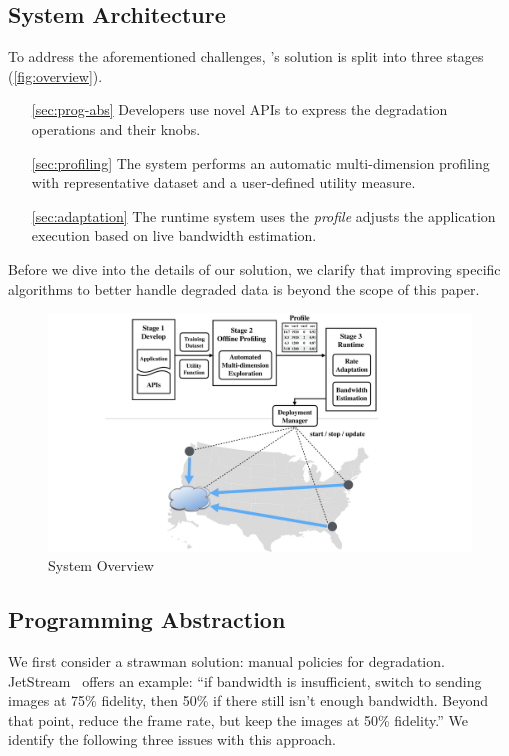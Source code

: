 \subsection{System Architecture}
\label{sec:architecture}

To address the aforementioned challenges, \sysname{}'s solution is split into
three stages (\autoref{fig:overview}).

\begin{itemize}
\item [\autoref{sec:prog-abs}] Developers use novel \sysname{} APIs to express
  the degradation operations and their knobs.
\item [\autoref{sec:profiling}] The system performs an automatic multi-dimension
  profiling with representative dataset and a user-defined utility measure.
\item [\autoref{sec:adaptation}] The runtime system uses the \textit{profile}
  adjusts the application execution based on live bandwidth estimation.
\end{itemize}

Before we dive into the details of our solution, we clarify that improving
specific algorithms to better handle degraded data is beyond the scope of this
paper.

\begin{figure}
  \centering
  \includegraphics[width=\columnwidth]{figures/arch.pdf}
  \caption{System Overview}
  \label{fig:overview}
\end{figure}

\subsection{Programming Abstraction}
\label{sec:prog-abs}

We first consider a strawman solution: manual policies for
degradation. JetStream~\cite{rabkin2014aggregation} offers an example: ``if
bandwidth is insufficient, switch to sending images at 75\% fidelity, then 50\%
if there still isn't enough bandwidth. Beyond that point, reduce the frame rate,
but keep the images at 50\% fidelity.'' We identify the following three issues
with this approach.

